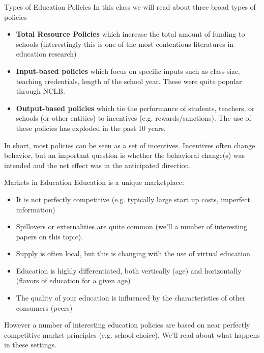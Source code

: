 \documentclass{beamer}
\begin{document}
\begin{frame}{Types of Education Policies}
In this class we will read about three broad types of policies
    \begin{itemize}
        \item \textbf{Total Resource Policies} which increase the total amount of funding to schools (interestingly this is one of the most contentious literatures in education research)
        \item \textbf{Input-based policies} which focus on specific inputs such as class-size, teaching credentials, length of the school year. These were quite popular through NCLB. 
        \item \textbf{Output-based policies} which tie the performance of students, teachers, or schools (or other entities) to incentives (e.g. rewards/sanctions). The use of these policies has exploded in the past 10 years.   
    \end{itemize}
\medskip
In short, most policies can be seen as a set of incentives. Incentives often change behavior, but an important question is whether the behavioral change(s) was intended and the net effect was in the anticipated direction. 
    
\end{frame}

\begin{frame}{Markets in Education}
Education is a unique marketplace:    
    \begin{itemize}
        \item It is not perfectly competitive (e.g. typically large start up costs, imperfect information)
        \item Spillovers or externalities are quite common (we'll a number of interesting papers on this topic). 
        \item Supply is often local, but this is changing with the use of virtual education
        \item Education is highly differentiated, both vertically (age) and horizontally (flavors of education for a given age)
        \item The quality of your education is influenced by the characteristics of other consumers (peers)
    \end{itemize}
\medskip
However a number of interesting education policies are based on near perfectly competitive market principles (e.g. school choice). We'll read about what happens in these settings.
\end{frame}
\end{document}
